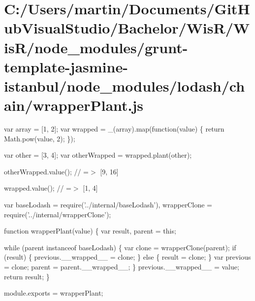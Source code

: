 \hypertarget{_c_1_2_users_2martin_2_documents_2_git_hub_visual_studio_2_bachelor_2_wis_r_2_wis_r_2node_module8abc69290b519a3b73d96429fa233ed4}{}\section{C\+:/\+Users/martin/\+Documents/\+Git\+Hub\+Visual\+Studio/\+Bachelor/\+Wis\+R/\+Wis\+R/node\+\_\+modules/grunt-\/template-\/jasmine-\/istanbul/node\+\_\+modules/lodash/chain/wrapper\+Plant.\+js}
var array = \mbox{[}1, 2\mbox{]}; var wrapped = \+\_\+(array).map(function(value) \{ return Math.\+pow(value, 2); \});

var other = \mbox{[}3, 4\mbox{]}; var other\+Wrapped = wrapped.\+plant(other);

other\+Wrapped.\+value(); // =$>$ \mbox{[}9, 16\mbox{]}

wrapped.\+value(); // =$>$ \mbox{[}1, 4\mbox{]}


\begin{DoxyCodeInclude}
var baseLodash = require(\textcolor{stringliteral}{'../internal/baseLodash'}),
    wrapperClone = require(\textcolor{stringliteral}{'../internal/wrapperClone'});

\textcolor{keyword}{function} wrapperPlant(value) \{
  var result,
      parent = \textcolor{keyword}{this};

  \textcolor{keywordflow}{while} (parent instanceof baseLodash) \{
    var clone = wrapperClone(parent);
    \textcolor{keywordflow}{if} (result) \{
      previous.\_\_wrapped\_\_ = clone;
    \} \textcolor{keywordflow}{else} \{
      result = clone;
    \}
    var previous = clone;
    parent = parent.\_\_wrapped\_\_;
  \}
  previous.\_\_wrapped\_\_ = value;
  \textcolor{keywordflow}{return} result;
\}

module.exports = wrapperPlant;
\end{DoxyCodeInclude}
 